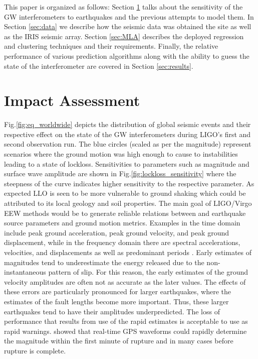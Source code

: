 \documentclass[twocolumn, aps, superscriptaddress]{revtex4}
\begin{document}
This paper is organized as follows: Section \ref{sec:motivation} talks about the sensitivity of the GW interferometers to earthquakes and the previous attempts to model them. In Section \ref{sec:data} we describe how the seismic data was obtained the site as well as the IRIS seismic array. Section \ref{sec:MLA} describes the deployed regression and clustering techniques and their requirements. Finally, the relative performance of various prediction algorithms along with the ability to guess the state of the interferometer are covered in Section \ref{sec:results}.

\section{Impact Assessment}\label{sec:motivation}
Fig.\ref{fig:eq_worldwide} depicts the distribution of global seismic events and their respective effect on the state of the GW interferometers during LIGO's first and second observation run. The blue circles (scaled as per the magnitude) represent scenarios where the ground motion was high enough to cause to instabilities leading to a state of lockloss. Sensitivities to parameters such as magnitude and surface wave amplitude are shown in Fig.\ref{fig:lockloss_sensitivity} where the steepness of the curve indicates higher sensitivity to the respective parameter. As expected LLO is seen to be more vulnerable to ground shaking which could be attributed to its local geology and soil properties.
The main goal of LIGO/Virgo EEW methods would be to generate reliable relations between and earthquake source parameters and ground motion metrics. Examples in the time domain include peak ground acceleration, peak ground velocity, and peak
ground displacement, while in the frequency domain there are spectral accelerations, velocities, and displacements as well as predominant periods \cite{Do2003}.  Early estimates of magnitudes tend to underestimate the energy released due to the non-instantaneous pattern of slip.
For this reason, the early estimates of the ground velocity amplitudes are often not as accurate as the later values. 
The effects of these errors are particularly pronounced for larger earthquakes, where the estimates of the fault lengths become more important.
Thus, these larger earthquakes tend to have their amplitudes underpredicted.
The loss of performance that results from use of the rapid estimates is acceptable to use as rapid warnings.
\cite{MeCr2015} showed that real-time GPS waveforms could rapidly determine the magnitude within the first minute of rupture and in many cases before rupture is complete.
\end{document}

